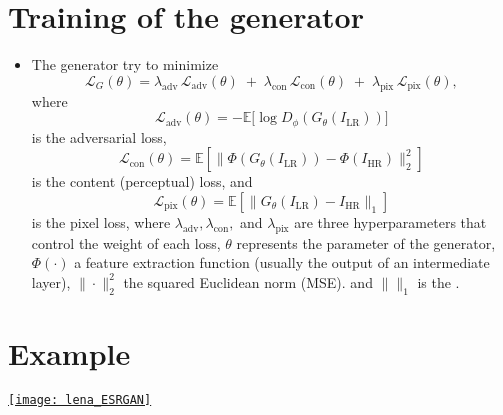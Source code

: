 \section*{Training of the generator}
\begin{itemize}
\item The generator try to minimize
\begin{equation}
\mathcal{L}_G(\theta) = 
\lambda_{\text{adv}} \, \mathcal{L}_{\text{adv}}(\theta) \;+\;
\lambda_{\text{con}} \, \mathcal{L}_{\text{con}}(\theta) \;+\;
\lambda_{\text{pix}} \, \mathcal{L}_{\text{pix}}(\theta),
\end{equation}
where
\begin{equation}
  \mathcal{L}_{\text{adv}}(\theta) = - \mathbb{E}\big[ \log D_\phi(G_\theta(I_{\text{LR}})) \big]
\end{equation}
is the adversarial loss,
\begin{equation}
\mathcal{L}_{\text{con}}(\theta) = \mathbb{E}\left[ \big\| \Phi(G_\theta(I_{\text{LR}})) - \Phi(I_{\text{HR}}) \big\|_2^2 \right]
\end{equation}
is the content (perceptual) loss, and
\begin{equation}
\mathcal{L}_{\text{pix}}(\theta) = \mathbb{E}\left[ \| G_\theta(I_{\text{LR}}) - I_{\text{HR}} \|_1 \right]
\end{equation}
is the pixel loss, where $\lambda_{\text{adv}}, \lambda_{\text{con}},$
and $\lambda_{\text{pix}}$ are three hyperparameters that control the
weight of each loss, $\theta$ represents the parameter of the
generator, $\Phi(\cdot)$ a feature extraction function (usually the
output of an intermediate layer), $\big\|\cdot\big\|_2^2$ the squared
Euclidean norm (\gls{MSE}). and $\|\|_1$ is the .

\end{itemize}

\section*{Example}
\begin{center}
  \href{https://github.com/vicente-gonzalez-ruiz/medical_imaging/blob/main/notebooks/ESRGAN.ipynb}{\texttt{[image: lena\_ESRGAN]}}
\end{center}

